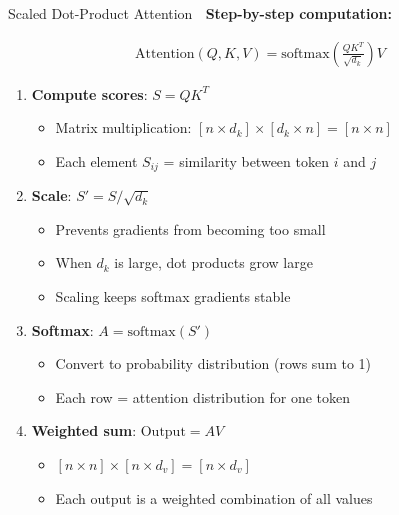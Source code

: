 \documentclass[aspectratio=169]{beamer}
\begin{document}
\begin{frame}[shrink=10]{Scaled Dot-Product Attention 📐}
\textbf{Step-by-step computation:}

\vspace{1em}

\begin{align*}
\text{Attention}(Q, K, V) = \text{softmax}\left(\frac{QK^T}{\sqrt{d_k}}\right)V
\end{align*}

\vspace{1em}

\begin{enumerate}\setlength{\itemsep}{0pt}
    \item \textbf{Compute scores}: $S = QK^T$
    \begin{itemize}\setlength{\itemsep}{0pt}
        \item Matrix multiplication: $[n \times d_k] \times [d_k \times n] = [n \times n]$
        \item Each element $S_{ij}$ = similarity between token $i$ and $j$
    \end{itemize}

    \item \textbf{Scale}: $S' = S / \sqrt{d_k}$
    \begin{itemize}\setlength{\itemsep}{0pt}
        \item Prevents gradients from becoming too small
        \item When $d_k$ is large, dot products grow large
        \item Scaling keeps softmax gradients stable
    \end{itemize}

    \item \textbf{Softmax}: $A = \text{softmax}(S')$
    \begin{itemize}\setlength{\itemsep}{0pt}
        \item Convert to probability distribution (rows sum to 1)
        \item Each row = attention distribution for one token
    \end{itemize}

    \item \textbf{Weighted sum}: $\text{Output} = AV$
    \begin{itemize}\setlength{\itemsep}{0pt}
        \item $[n \times n] \times [n \times d_v] = [n \times d_v]$
        \item Each output is a weighted combination of all values
    \end{itemize}
\end{enumerate}
\end{frame}
\end{document}
